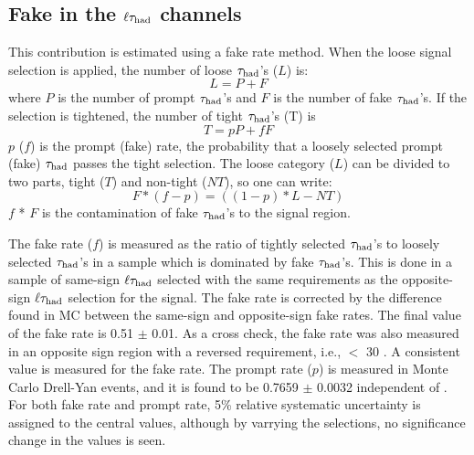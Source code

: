 \subsection{\texorpdfstring{Fake \Tau in the $\ell\tau_{\rm had}$ channels}{Fake tau the in lepton-tau channels}}

This contribution is estimated using a fake rate method.
When the loose signal selection is applied, the number of loose $\tau_{\rm had}$'s ($L$) is:
\begin{equation}
L = P + F
\end{equation}
where $P$ is the number of prompt $\tau_{\rm had}$'s and $F$ is the number of fake 
$\tau_{\rm had}$'s. If the selection is tightened, the number of tight $\tau_{\rm had}$'s (T) is
\begin{equation}
 T = pP + fF
\end{equation} 
$p$ ($f$) is the prompt (fake) rate, the probability that a loosely selected prompt (fake) $\tau_{\rm had}$ passes the  tight  selection. 
The loose category ($L$) can be divided to two parts, 
tight ($T$) and non-tight ($NT$), so one can write:
\begin{equation}
   F * (f - p) = ((1 - p) * L - NT)
\end{equation}
$f$ * $F$ is the contamination of fake $\tau_{\rm had}$'s to the signal region. 

The fake rate ($f$) is measured as the ratio of tightly selected $\tau_{\rm had}$'s to loosely 
selected $\tau_{\rm had}$'s in a sample which is dominated by fake $\tau_{\rm had}$'s. This is done in a sample of same-sign $\ell\tau_{\rm had}$ selected 
with the same requirements as the opposite-sign $\ell\tau_{\rm had}$
selection for the signal.
The fake rate is corrected by the difference found in MC between the 
same-sign and opposite-sign fake rates.
The final value of the fake rate is 0.51 $\pm$ 0.01. 
As a cross check, the fake rate was also measured in an opposite sign region with a reversed
\MET requirement, i.e., \MET $<$ 30 \GeV.
A consistent value is measured for the fake rate.  
The prompt rate ($p$) is measured in Monte Carlo Drell-Yan events, and it is found to 
be 0.7659 $\pm$ 0.0032 independent of \mttwo. 
For both fake rate and prompt rate, 5\% relative systematic uncertainty is assigned to the central values, although 
by varrying the selections, no significance change in the values is seen.

